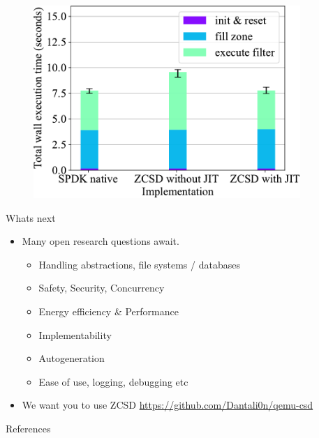 \documentclass{beamer}
\newcommand\cstyle{
	\lstset{
		language=c,
		basicstyle=\ttm,
		showstringspaces=false,
		tabsize=4,
		aboveskip=0.2cm,
		belowskip=0.2cm,
		otherkeywords={self},             %
		emph={MyClass,__init__},          %
		keywordstyle=\ttb\color{deepblue},
		emphstyle=\ttb\color{deepred},    %
		stringstyle=\ttm\color{deepgreen},
		frame=tb,                          %
		prebreak=\textbackslash,
		linewidth=5cm,
		breaklines=true,
	}
}
\newcommand\cexternal[2][]{{\cstyle}}
\begin{document}
\begin{frame}{}
	\begingroup
	\small
			\begin{figure}
				\centering
				\includegraphics[width=0.9\textwidth]{resources/images/performance-crop}
			\end{figure}
	\endgroup
\end{frame}

\begin{frame}{Whats next}
	\begingroup
	\small
	\begin{itemize}
		\item Many open research questions await.
		\begin{itemize}
			\item Handling abstractions, file systems / databases
			\item Safety, Security, Concurrency
			\item Energy efficiency \& Performance
			\item Implementability
			\item Autogeneration
			\item Ease of use, logging, debugging etc
		\end{itemize}
		\item We want you to use ZCSD \href{https://github.com/Dantali0n/qemu-csd}{https://github.com/Dantali0n/qemu-csd}
	\end{itemize}
	\endgroup
\end{frame}

\begin{frame}{References}
	\begingroup
	\tiny
	
	
	\endgroup
\end{frame}
\end{document}
